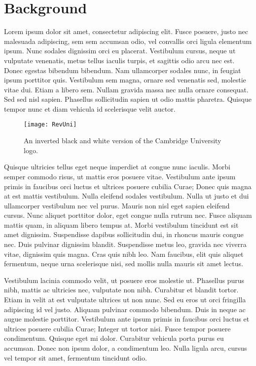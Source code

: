 \chapter{Background}

Lorem ipsum dolor sit amet, consectetur adipiscing elit. Fusce posuere, justo nec malesuada adipiscing, sem sem accumsan odio, vel convallis orci ligula elementum ipsum. Nunc sodales dignissim orci eu placerat. Vestibulum cursus, neque ut vulputate venenatis, metus tellus iaculis turpis, et sagittis odio arcu nec est. Donec egestas bibendum bibendum. Nam ullamcorper sodales nunc, in feugiat ipsum porttitor quis. Vestibulum sem magna, ornare sed venenatis sed, molestie vitae dui. Etiam a libero sem. Nullam gravida massa nec nulla ornare consequat. Sed sed nisl sapien. Phasellus sollicitudin sapien ut odio mattis pharetra. Quisque tempor nunc et diam vehicula id scelerisque velit auctor.

\begin{figure}[ht]
    \centering
    \texttt{[image: RevUni]}
    \caption[Cambridge University Inverted Logo]{An inverted black and white version of the Cambridge University logo.}
    \label{fig:invBWUniLogo}
\end{figure}

Quisque ultricies tellus eget neque imperdiet at congue nunc iaculis. Morbi semper commodo risus, ut mattis eros posuere vitae. Vestibulum ante ipsum primis in faucibus orci luctus et ultrices posuere cubilia Curae; Donec quis magna at est mattis vestibulum. Nulla eleifend sodales vestibulum. Nulla ut justo et dui ullamcorper vestibulum nec vel purus. Mauris non nisl eget sapien eleifend cursus. Nunc aliquet porttitor dolor, eget congue nulla rutrum nec. Fusce aliquam mattis quam, in aliquam libero tempus at. Morbi vestibulum tincidunt est sit amet dignissim. Suspendisse dapibus sollicitudin dui, in rhoncus mauris congue nec. Duis pulvinar dignissim blandit. Suspendisse metus leo, gravida nec viverra vitae, dignissim quis magna. Cras quis nibh leo. Nam faucibus, elit quis aliquet fermentum, neque urna scelerisque nisi, sed mollis nulla mauris sit amet lectus.

Vestibulum lacinia commodo velit, ut posuere eros molestie ut. Phasellus purus nibh, mattis ac ultricies nec, vulputate non nibh. Curabitur et blandit tortor. Etiam in velit at est vulputate ultrices ut non nunc. Sed eu eros ut orci fringilla adipiscing id vel justo. Aliquam pulvinar commodo bibendum. Duis in neque ac augue molestie porttitor. Vestibulum ante ipsum primis in faucibus orci luctus et ultrices posuere cubilia Curae; Integer ut tortor nisi. Fusce tempor posuere condimentum. Quisque eget mi dolor. Curabitur vehicula porta purus eu accumsan. Donec non ipsum dolor, a condimentum leo. Nulla ligula arcu, cursus vel tempor sit amet, fermentum tincidunt odio.

